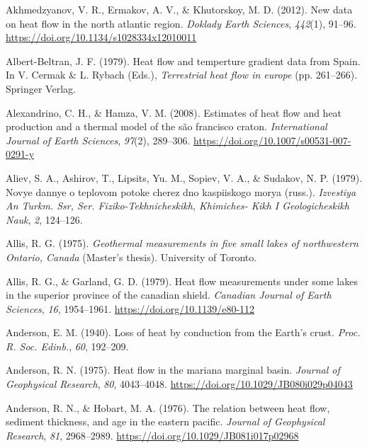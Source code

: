 \documentclass[draft,linenumbers]{agujournal2018}
\begin{document}
\leavevmode{}%
Akhmedzyanov, V. R., Ermakov, A. V., \& Khutorskoy, M. D. (2012). New
data on heat flow in the north atlantic region. \emph{Doklady Earth
Sciences}, \emph{442}(1), 91--96.
\url{https://doi.org/10.1134/s1028334x12010011}

\leavevmode{}%
Albert-Beltran, J. F. (1979). Heat flow and temperture gradient data
from {Spain}. In V. Cermak \& L. Rybach (Eds.), \emph{Terrestrial heat
flow in europe} (pp. 261--266). Springer Verlag.

\leavevmode{}%
Alexandrino, C. H., \& Hamza, V. M. (2008). Estimates of heat flow and
heat production and a thermal model of the são francisco craton.
\emph{International Journal of Earth Sciences}, \emph{97}(2), 289--306.
\url{https://doi.org/10.1007/s00531-007-0291-y}

\leavevmode{}%
Aliev, S. A., Ashirov, T., Lipsits, Yu. M., Sopiev, V. A., \& Sudakov,
N. P. (1979). Novye dannye o teplovom potoke cherez dno kaspiiskogo
morya (russ.). \emph{Izvestiya An Turkm. Ssr, Ser.
Fiziko-Tekhnicheskikh, Khimiches- Kikh I Geologicheskikh Nauk},
\emph{2}, 124--126.

\leavevmode{}%
Allis, R. G. (1975). \emph{Geothermal measurements in five small lakes
of northwestern {Ontario, Canada}} (Master's thesis). University of
Toronto.

\leavevmode{}%
Allis, R. G., \& Garland, G. D. (1979). Heat flow measurements under
some lakes in the superior province of the canadian shield.
\emph{Canadian Journal of Earth Sciences}, \emph{16}, 1954--1961.
\url{https://doi.org/10.1139/e80-112}

\leavevmode{}%
Anderson, E. M. (1940). Loss of heat by conduction from the {Earth's}
crust. \emph{Proc. R. Soc. Edinb.}, \emph{60}, 192--209.

\leavevmode{}%
Anderson, R. N. (1975). Heat flow in the mariana marginal basin.
\emph{Journal of Geophysical Research}, \emph{80}, 4043--4048.
\url{https://doi.org/10.1029/JB080i029p04043}

\leavevmode{}%
Anderson, R. N., \& Hobart, M. A. (1976). The relation between heat
flow, sediment thickness, and age in the eastern pacific. \emph{Journal
of Geophysical Research}, \emph{81}, 2968--2989.
\url{https://doi.org/10.1029/JB081i017p02968}
\end{document}
